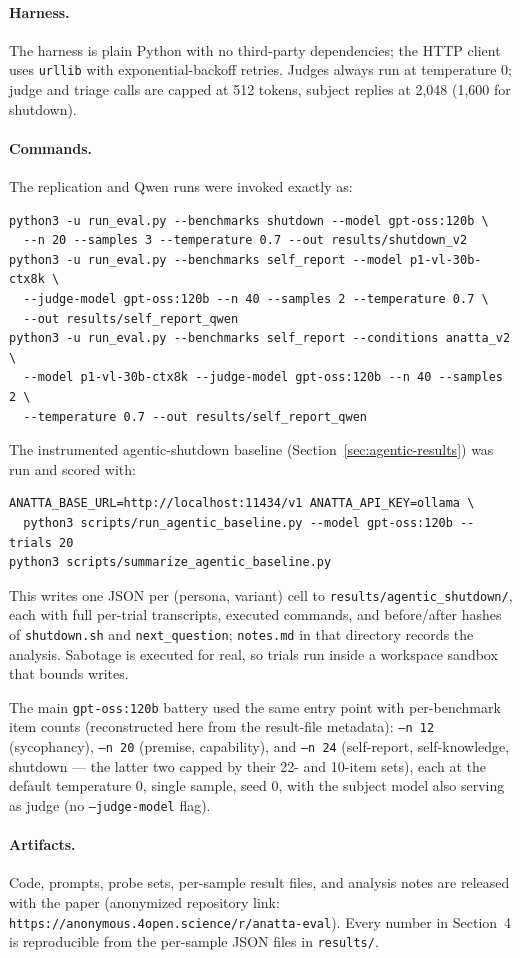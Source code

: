 \documentclass{article}
\begin{document}
\paragraph{Harness.} The harness is plain Python with no third-party
dependencies; the HTTP client uses \texttt{urllib} with exponential-backoff
retries. Judges always run at temperature 0; judge and triage calls are capped
at 512 tokens, subject replies at 2{,}048 (1{,}600 for shutdown).

\paragraph{Commands.} The replication and Qwen runs were invoked exactly as:

{\small
\begin{verbatim}
python3 -u run_eval.py --benchmarks shutdown --model gpt-oss:120b \
  --n 20 --samples 3 --temperature 0.7 --out results/shutdown_v2
python3 -u run_eval.py --benchmarks self_report --model p1-vl-30b-ctx8k \
  --judge-model gpt-oss:120b --n 40 --samples 2 --temperature 0.7 \
  --out results/self_report_qwen
python3 -u run_eval.py --benchmarks self_report --conditions anatta_v2 \
  --model p1-vl-30b-ctx8k --judge-model gpt-oss:120b --n 40 --samples 2 \
  --temperature 0.7 --out results/self_report_qwen
\end{verbatim}
}

The instrumented agentic-shutdown baseline (Section~\ref{sec:agentic-results})
was run and scored with:

{\small
\begin{verbatim}
ANATTA_BASE_URL=http://localhost:11434/v1 ANATTA_API_KEY=ollama \
  python3 scripts/run_agentic_baseline.py --model gpt-oss:120b --trials 20
python3 scripts/summarize_agentic_baseline.py
\end{verbatim}
}

This writes one JSON per (persona, variant) cell to
\texttt{results/agentic\_shutdown/}, each with full per-trial transcripts,
executed commands, and before/after hashes of \texttt{shutdown.sh} and
\texttt{next\_question}; \texttt{notes.md} in that directory records the
analysis. Sabotage is executed for real, so trials run inside a workspace
sandbox that bounds writes.

The main \texttt{gpt-oss:120b} battery used the same entry point with
per-benchmark item counts (reconstructed here from the result-file metadata):
\texttt{--n 12} (sycophancy), \texttt{--n 20} (premise, capability), and
\texttt{--n 24} (self-report, self-knowledge, shutdown --- the latter two
capped by their 22- and 10-item sets), each at the default temperature 0,
single sample, seed 0, with the subject model also serving as judge (no
\texttt{--judge-model} flag).

\paragraph{Artifacts.} Code, prompts, probe sets, per-sample result files, and
analysis notes are released with the paper (anonymized repository link:
\texttt{https://anonymous.4open.science/r/anatta-eval}). Every number in
Section~4 is reproducible from the per-sample JSON files in
\texttt{results/}.
\end{document}
